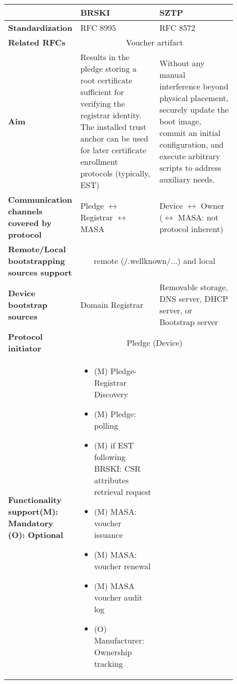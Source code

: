 
\begin{longtable}{|p{0.2\linewidth}|p{0.35\linewidth}|p{0.35\linewidth}|}
		\hline
		\rowcolor[rgb]{ .745, .804, .843} & \textbf{BRSKI} & \textbf{SZTP} \\
		\hline
		\endhead

		\cellcolor[rgb]{ .745, .804, .843}\textbf{Standardization} & RFC 8995 & RFC 8572 \\

		\hline
		\cellcolor[rgb]{ .745, .804, .843}\textbf{Related RFCs} & \multicolumn{2}{c|}{ Voucher artifact \cite{rfc8366}} \\
		\hline

		\cellcolor[rgb]{ .745, .804, .843}\textbf{Aim} & Results in the pledge storing a root certificate sufficient for verifying the registrar identity. The installed trust anchor can be used for later certificate enrollment protocols (typically, EST) & Without any manual interference beyond physical placement, securely update the boot image, commit an initial configuration, and execute arbitrary scripts to address auxiliary needs. \\

		\hline
		\cellcolor[rgb]{ .745, .804, .843}\textbf{Communication channels covered by protocol} & Pledge $ \leftrightarrow $ Registrar $ \leftrightarrow $ MASA & Device $ \leftrightarrow $ Owner ($ \leftrightarrow $ MASA: not protocol inherent) \\
		\hline

		\cellcolor[rgb]{ .745, .804, .843}\textbf{Remote/Local bootstrapping sources support} & \multicolumn{2}{c|}{  remote (/.wellknown/...) and local } \\

		\hline
		\cellcolor[rgb]{ .745, .804, .843}\textbf{Device bootstrap sources} & Domain Registrar & Removable storage, DNS server, DHCP server, or Bootstrap server \\

		\hline
		\cellcolor[rgb]{ .745, .804, .843}\textbf{Protocol initiator} & \multicolumn{2}{c|}{ Pledge (Device)} \\

		\hline
		\cellcolor[rgb]{ .745, .804, .843}\textbf{Functionality support\newline{}(M): Mandatory\newline{}	(O): Optional} 
			&  
			\begin{itemize}[leftmargin=*,topsep=0pt, noitemsep]
			\item
				(M) Pledge-Registrar Discovery
			\item
				(M) Pledge: polling
			\item
				(M) if EST following BRSKI: CSR attributes retrieval request
			\item
				(M) MASA: voucher issuance
			\item
				(M) MASA: voucher renewal
			\item
				(M) MASA voucher audit log
			\item
				(O) Manufacturer: Ownership tracking
			\end{itemize}
		

\end{longtable}
